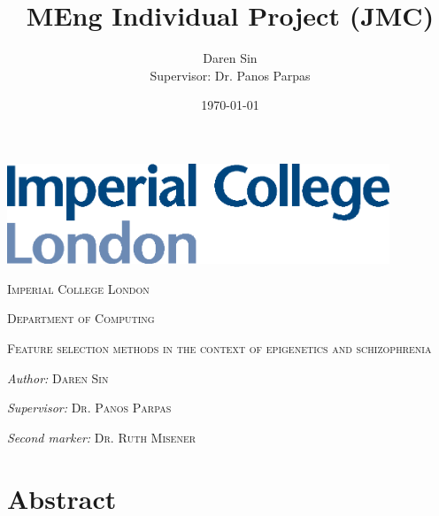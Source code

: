 \documentclass[12pt, twoside, a4paper]{report}
\title{MEng Individual Project (JMC)}
\author{Daren Sin \\  Supervisor: Dr. Panos Parpas}
\date{\today}
\newcommand\blankpage{%
    \null
    \thispagestyle{empty}%
    \addtocounter{page}{-1}%
    \newpage}
\begin{document}
\begin{titlingpage}

\vspace*{1.5cm}

\begin{center}
\includegraphics[height=3cm]{images/imperial}
\end{center}

\vspace{1.5cm}
\begin{center}
\Large \textsc{Imperial College London}

\textsc{Department of Computing}
\end{center}

\vspace{2cm}

\begin{center}
\Large \textsc{\thetitle}

\vspace{2cm}

\textsc{Feature selection methods in the context of epigenetics and schizophrenia}
\end{center}

\vspace{2cm}

\begin{center}
\large \textit{Author:} \textsc{Daren Sin}

\textit{Supervisor:} \textsc{Dr. Panos Parpas}

\textit{Second marker:} \textsc{Dr. Ruth Misener}
\end{center}

\vspace{2cm}

\begin{center}
\normalsize \textsc{\thedate}
\end{center}

\end{titlingpage}


\afterpage{\blankpage}

\onehalfspacing
\chapter*{Abstract}
\end{document}
